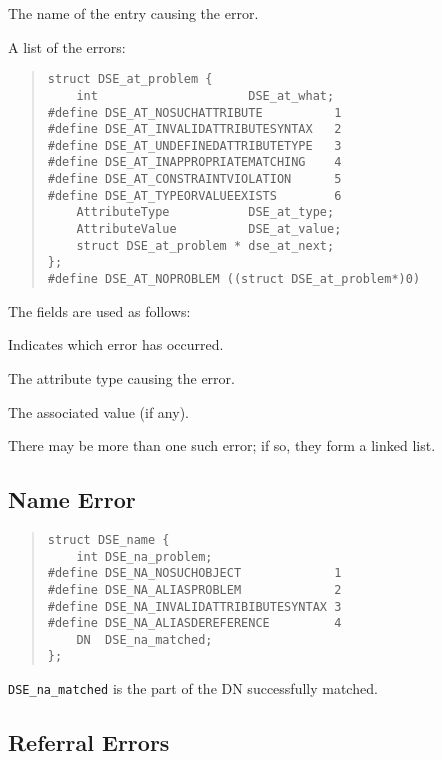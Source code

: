 \begin{describe}
\item [\verb"DSE\_at\_name":] The name of the entry causing the error.
\item [\verb"DSE\_at\_plist":] A list of the errors:
\begin{quote}\small\begin{verbatim}
struct DSE_at_problem {
    int                     DSE_at_what;
#define DSE_AT_NOSUCHATTRIBUTE          1
#define DSE_AT_INVALIDATTRIBUTESYNTAX   2
#define DSE_AT_UNDEFINEDATTRIBUTETYPE   3
#define DSE_AT_INAPPROPRIATEMATCHING    4
#define DSE_AT_CONSTRAINTVIOLATION      5
#define DSE_AT_TYPEORVALUEEXISTS        6
    AttributeType           DSE_at_type;
    AttributeValue          DSE_at_value;
    struct DSE_at_problem * dse_at_next;
};
#define DSE_AT_NOPROBLEM ((struct DSE_at_problem*)0)
\end{verbatim}\end{quote}

The fields are used as follows:
\begin{describe}
\item [\verb"DSE\_at\_what":] Indicates which error has occurred.
\item [\verb"DSE\_at\_type":] The attribute type causing the error.
\item [\verb"DSE\_at\_value":] The associated value (if any).
\item [\verb"dse\_at\_next":] There may be more than one such error; if
so, they form a linked list.
\end{describe}
\end{describe}



\subsection{Name Error}
\begin{quote}\small\begin{verbatim}
struct DSE_name {
    int DSE_na_problem;
#define DSE_NA_NOSUCHOBJECT             1
#define DSE_NA_ALIASPROBLEM             2
#define DSE_NA_INVALIDATTRIBIBUTESYNTAX 3
#define DSE_NA_ALIASDEREFERENCE         4
    DN  DSE_na_matched;
};
\end{verbatim}\end{quote}

\verb"DSE_na_matched" is the part of the DN successfully matched.

\subsection{Referral Errors}

